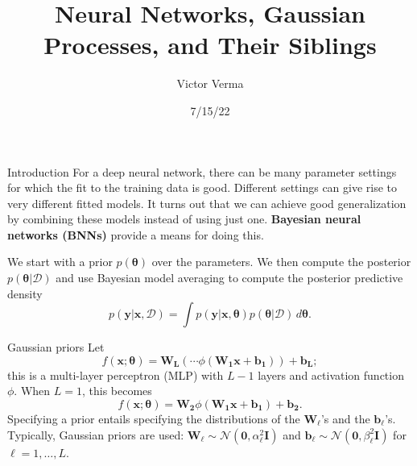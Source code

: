 \documentclass{beamer}
\title[NNs, GPs, and Their Siblings]{
Neural Networks, Gaussian Processes, and Their Siblings
}
\author[Victor Verma]{Victor Verma}
\institute[]{Hot Ideas in Machine Learning Reading Group, University of Michigan}
\date{7/15/22}
\begin{document}
\begin{frame}
  \titlepage
\end{frame}



\begin{frame}{Introduction}
    For a deep neural network, there can be many parameter settings for which the fit to the training data is good. Different settings can give rise to very different fitted models. It turns out that we can achieve good generalization by combining these models instead of using just one. \textbf{Bayesian neural networks (BNNs)} provide a means for doing this.
    
    \medskip
    
    We start with a prior $p(\boldsymbol{\theta})$ over the parameters. We then compute the posterior $p(\boldsymbol{\theta} | \mathcal{D})$ and use Bayesian model averaging to compute the posterior predictive density
    \begin{equation*}
        p(\boldsymbol{y} | \boldsymbol{x}, \mathcal{D}) = \int p(\boldsymbol{y} | \boldsymbol{x}, \boldsymbol{\theta})p(\boldsymbol{\theta} | \mathcal{D})\,d\boldsymbol{\theta}.
    \end{equation*}
\end{frame}

\begin{frame}{Gaussian priors}
    Let
    \[
    f(\boldsymbol{x}; \boldsymbol{\theta}) = \boldsymbol{W_L}(\cdots\phi(\boldsymbol{W_1}\boldsymbol{x} + \boldsymbol{b_1})) + \boldsymbol{b_L};
    \]
    this is a multi-layer perceptron (MLP) with $L - 1$ layers and activation function $\phi$. When $L = 1$, this becomes
    \[
    f(\boldsymbol{x}; \boldsymbol{\theta}) = \boldsymbol{W_2}\phi(\boldsymbol{W_1}\boldsymbol{x} + \boldsymbol{b_1}) + \boldsymbol{b_2}.
    \]
    Specifying a prior entails specifying the distributions of the $\boldsymbol{W}_{\ell}$'s and the $\boldsymbol{b}_{\ell}$'s. Typically, Gaussian priors are used: $\boldsymbol{W}_{\ell} \sim \mathcal{N}(\boldsymbol{0}, \alpha_{\ell}^2\boldsymbol{I})$ and $\boldsymbol{b}_{\ell} \sim \mathcal{N}(\boldsymbol{0}, \beta_{\ell}^2\boldsymbol{I})$ for $\ell = 1, \ldots, L$.
\end{frame}
\end{document}
